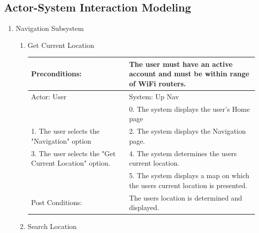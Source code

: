 \documentclass{article}
\begin{document}
\begin{enumerate}
\begin{center}
\subsection{Actor-System Interaction Modeling}
	
\begin{enumerate}
\item{Navigation Subsystem}
	\begin{enumerate}
	\item{Get Current Location}
	\begin{table}[H]
	\centering
	
		\begin{tabular}{ | p{15em} | p{15em}| } 
		\hline
		Preconditions: 							& The user must have an active account and must be within range of WiFi routers. \\
		\hline
		Actor: User 								&  System: Up Nav \\ 
		\hline
											& 0. The system  displays the user's Home page\\ 
		\hline
		1. The user selects the "Navigation" option			& 2. The system displays the Navigation page. \\
		\hline
		3. The user selects the "Get Current Location" option. 	& 4. The system determines the users current location. \\
		\hline																
											& 5. The system displays a map on which the users current location is presented. \\
		\hline
		Post Conditions: 							& The users location is determined and displayed. \\
		\hline
		\end{tabular}
	\end{table}

	\item{Search Location}


\end{enumerate}
\end{enumerate}
\end{center}
\end{enumerate}
\end{document}
